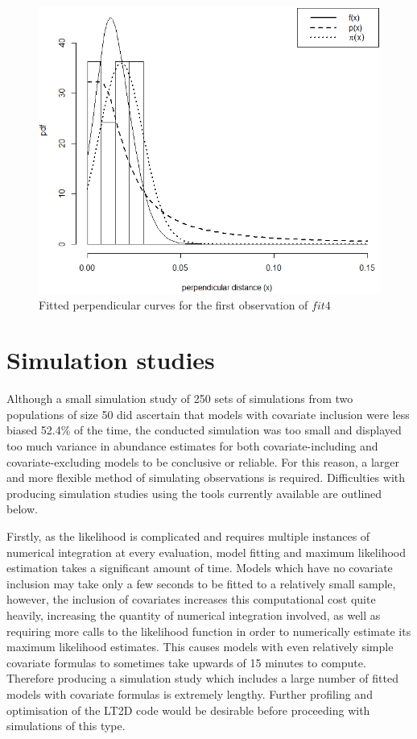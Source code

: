 \documentclass[11pt]{article}
\begin{document}
\begin{multicols}{2}
\begin{figure}[H]
\center
\includegraphics[scale=0.53]{fig12}
\caption{Fitted perpendicular curves for the first observation of $fit4$}
\end{figure}

\section{Simulation studies}
Although a small simulation study of 250 sets of simulations from two populations of size 50 did ascertain that models with covariate inclusion were less biased 52.4\% of the time, the conducted simulation was too small and displayed too much variance in abundance estimates for both covariate-including and covariate-excluding models to be conclusive or reliable. For this reason, a larger and more flexible method of simulating observations is required. Difficulties with producing simulation studies using the tools currently available are outlined below.

Firstly, as the \cite{Borchers} likelihood is complicated and requires multiple instances of numerical integration at every evaluation, model fitting and maximum likelihood estimation takes a significant amount of time. Models which have no covariate inclusion may take only a few seconds to be fitted to a relatively small sample, however, the inclusion of covariates increases this computational cost quite heavily, increasing the quantity of numerical integration involved, as well as requiring more calls to the likelihood function in order to numerically estimate its maximum likelihood estimates. This causes models with even relatively simple covariate formulas to sometimes take upwards of 15 minutes to compute. Therefore producing a simulation study which includes a large number of fitted models with covariate formulas is extremely lengthy. Further profiling and optimisation of the LT2D code would be desirable before proceeding with simulations of this type.\\\\


\end{multicols}
\end{document}

